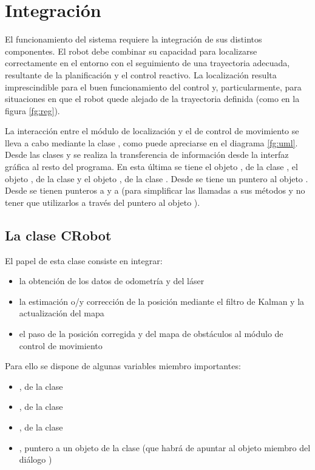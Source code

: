 
\chapter{Integración}
El funcionamiento del sistema requiere la integración de sus distintos componentes. El robot debe combinar su capacidad para localizarse correctamente en el entorno con el seguimiento de una trayectoria adecuada, resultante de la planificación y el control reactivo. La localización resulta imprescindible para el buen funcionamiento del control y, particularmente, para situaciones en que el robot quede alejado de la trayectoria definida (como en la figura \ref{fg:reg}).

La interacción entre el módulo de localización y el de control de movimiento se lleva a cabo mediante la clase , como puede apreciarse en el diagrama \ref{fg:uml}. Desde las clases  y  se realiza la transferencia de información desde la interfaz gráfica al resto del programa. En esta última se tiene el objeto , de la clase , el objeto , de la clase  y el objeto , de la clase . Desde  se tiene un puntero al objeto . Desde  se tienen punteros a   y a  (para simplificar las llamadas a sus métodos y no tener que utilizarlos a través del puntero al objeto ).

\section{La clase CRobot}
El papel de esta clase consiste en integrar:
\begin{itemize}
  \item la obtención de los datos de odometría y del láser
  \item la estimación o/y corrección de la posición mediante el filtro de Kalman y la actualización del mapa
  \item el paso de la posición corregida y del mapa de obstáculos al módulo de control de movimiento
\end{itemize}

Para ello se dispone de algunas variables miembro importantes:
\begin{itemize}
  \item {}, de la clase 
  \item {}, de la clase 
  \item {}, de la clase 
  \item {}, puntero a un objeto de la clase  (que habrá de apuntar al objeto  miembro del diálogo )
\end{itemize}

